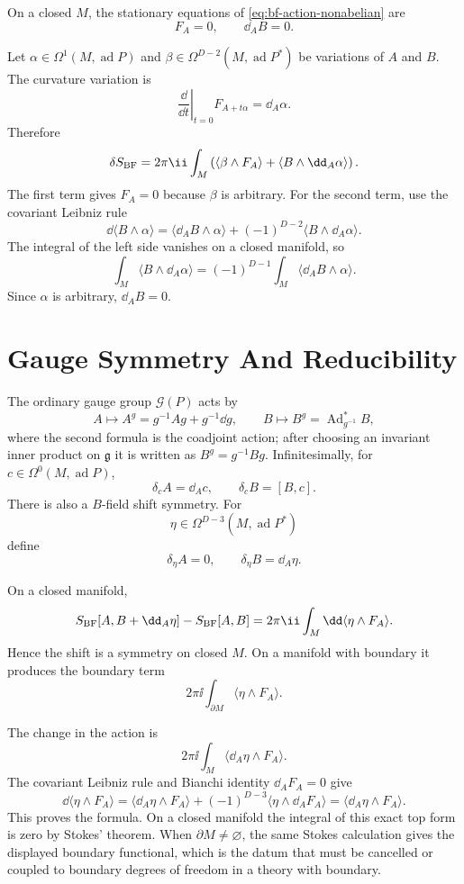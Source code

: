 \begin{remark}
\label{rem:bf-euler-lagrange}
On a closed \(M\), the stationary equations of
\eqref{eq:bf-action-nonabelian} are
\[
  F_A=0,
  \qquad
  \dd_A B=0 .
\]

Let \(\alpha\in\Omega^1(M,\operatorname{ad}P)\) and
\(\beta\in\Omega^{D-2}(M,\operatorname{ad}P^*)\) be variations of \(A\) and
\(B\).  The curvature variation is
\[
  \left.\frac{\dd}{\dd t}\right|_{t=0}F_{A+t\alpha}
  =
  \dd_A\alpha .
\]
Therefore
\[
  \delta S_{\rm BF}
  =
  2\pi\ii\int_M
  \left(
    \langle\beta\wedge F_A\rangle
    +
    \langle B\wedge\dd_A\alpha\rangle
  \right).
\]
The first term gives \(F_A=0\) because \(\beta\) is arbitrary.  For the second
term, use the covariant Leibniz rule
\[
  \dd\langle B\wedge\alpha\rangle
  =
  \langle\dd_A B\wedge\alpha\rangle
  +
  (-1)^{D-2}\langle B\wedge\dd_A\alpha\rangle .
\]
The integral of the left side vanishes on a closed manifold, so
\[
  \int_M\langle B\wedge\dd_A\alpha\rangle
  =
  (-1)^{D-1}\int_M\langle\dd_A B\wedge\alpha\rangle .
\]
Since \(\alpha\) is arbitrary, \(\dd_A B=0\).
\end{remark}

\section{Gauge Symmetry And Reducibility}

The ordinary gauge group \(\mathcal G(P)\) acts by
\[
  A\longmapsto A^g=g^{-1}Ag+g^{-1}\dd g,
  \qquad
  B\longmapsto B^g=\operatorname{Ad}^*_{g^{-1}}B,
\]
where the second formula is the coadjoint action; after choosing an invariant
inner product on \(\mathfrak g\) it is written as \(B^g=g^{-1}Bg\).
Infinitesimally, for \(c\in\Omega^0(M,\operatorname{ad}P)\),
\[
  \delta_c A=\dd_Ac,
  \qquad
  \delta_c B=[B,c].
\]
There is also a \(B\)-field shift symmetry.  For
\[
  \eta\in\Omega^{D-3}(M,\operatorname{ad}P^*)
\]
define
\[
  \delta_\eta A=0,
  \qquad
  \delta_\eta B=\dd_A\eta .
\]

\begin{remark}
\label{rem:bf-shift-invariance}
On a closed manifold,
\[
  S_{\rm BF}[A,B+\dd_A\eta]-S_{\rm BF}[A,B]
  =
  2\pi\ii\int_M \dd\langle\eta\wedge F_A\rangle .
\]
Hence the shift is a symmetry on closed \(M\).  On a manifold with boundary it
produces the boundary term
\[
  2\pi\ii\int_{\partial M}\langle\eta\wedge F_A\rangle .
\]

The change in the action is
\[
  2\pi\ii\int_M\langle\dd_A\eta\wedge F_A\rangle .
\]
The covariant Leibniz rule and Bianchi identity \(\dd_A F_A=0\) give
\[
  \dd\langle\eta\wedge F_A\rangle
  =
  \langle\dd_A\eta\wedge F_A\rangle
  +(-1)^{D-3}\langle\eta\wedge\dd_A F_A\rangle
  =
  \langle\dd_A\eta\wedge F_A\rangle .
\]
This proves the formula.
On a closed manifold the integral of this exact top form is zero by Stokes'
theorem.  When \(\partial M\neq\varnothing\), the same Stokes calculation gives
the displayed boundary functional, which is the datum that must be cancelled
or coupled to boundary degrees of freedom in a theory with boundary.
\end{remark}

